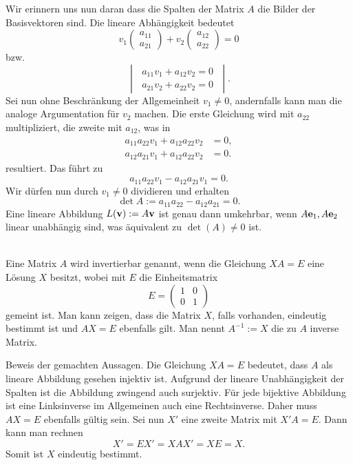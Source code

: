 Wir erinnern uns nun daran dass die Spalten der Matrix $A$ die Bilder
der Basisvektoren sind. Die lineare Abhängigkeit bedeutet%
\[v_1\begin{pmatrix}a_{11}\\ a_{21}\end{pmatrix}
+v_2\begin{pmatrix}a_{12}\\ a_{22}\end{pmatrix} = 0\]
bzw.
\[\begin{vmatrix}
\;a_{11}v_1 + a_{12}v_2 = 0\;\\
\;a_{21}v_2 + a_{22}v_2 = 0\;
\end{vmatrix}.\]
Sei nun ohne Beschränkung der Allgemeinheit $v_1\ne 0$, andernfalls
kann man die analoge Argumentation für $v_2$ machen. Die erste
Gleichung wird mit $a_{22}$ multipliziert, die zweite mit $a_{12}$,
was in%
\begin{align*}
a_{11}a_{22}v_1 + a_{12}a_{22}v_2 &= 0,\\
a_{12}a_{21}v_1 + a_{12}a_{22}v_2 &= 0.
\end{align*}
resultiert. Das führt zu
\[a_{11}a_{22}v_1 - a_{12}a_{21}v_1 = 0.\]
Wir dürfen nun durch $v_1\ne 0$ dividieren und erhalten%
\[\det A := a_{11}a_{22} - a_{12}a_{21} = 0.\]
 Eine lineare Abbildung $L(\mathbf{v}):=A\mathbf{v}$
ist genau dann umkehrbar, wenn $A\mathbf{e}_1,A\mathbf{e}_2$ linear
unabhängig sind, was äquivalent zu $\det(A)\ne 0$ ist.

\vspace{0.5em}\noindent
{}\\
Eine Matrix $A$ wird invertierbar genannt, wenn die Gleichung
$XA=E$ eine Lösung $X$ besitzt, wobei mit $E$ die Einheitsmatrix%
\[E = \begin{pmatrix}1 & 0\\ 0 & 1\end{pmatrix}\]
gemeint ist.
Man kann zeigen, dass die Matrix $X$, falls vorhanden, eindeutig
bestimmt ist und $AX=E$ ebenfalls gilt. Man nennt $A^{-1}:=X$ die
zu $A$ inverse Matrix.

Beweis der gemachten Aussagen. Die Gleichung $XA=E$ bedeutet,
dass $A$ als lineare Abbildung gesehen injektiv ist. Aufgrund der
lineare Unabhängigkeit der Spalten ist die Abbildung zwingend auch
surjektiv. Für jede bijektive Abbildung ist eine Linksinverse
im Allgemeinen auch eine Rechtsinverse. Daher muss $AX=E$ ebenfalls
gültig sein. Sei nun $X'$ eine zweite Matrix mit $X'A=E$. Dann kann
man rechnen%
\[X' = EX' = XAX' = XE = X.\]
Somit ist $X$ eindeutig bestimmt.


